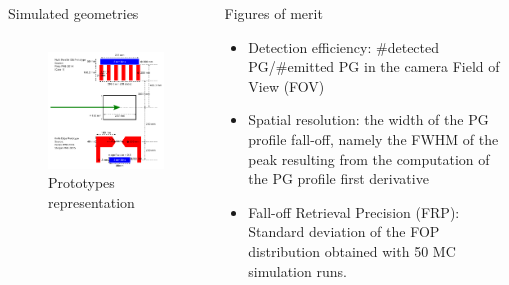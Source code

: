 \documentclass[final]{beamer} %
\begin{document}
\begin{frame}{}
\begin{columns}[t]
\begin{column}{0.49\textwidth}
\begin{block}{Simulated geometries}
\begin{columns}[t]
				\begin{column}{0.5\textwidth}
					\begin{figure}
						\includegraphics[width=\textwidth]{./figures/detectors_cyl}			
						\caption{Prototypes representation}
						\label{CamerasScheme}
					\end{figure}					
				\end{column}				

			\end{columns}

	  \end{block}		  
	\end{column} %
	
	\begin{column}{0.49\textwidth} %
	  \vspace{-2ex}
		
		
		
	  \begin{block}{Figures of merit}
			
			\begin{itemize}
				\item Detection efficiency: \#detected PG/\#emitted PG in the camera Field of View (FOV)
				\item Spatial resolution: the width of the PG profile fall-off, namely the FWHM of the peak resulting from the computation of the PG profile first derivative
				\item Fall-off Retrieval Precision (FRP): Standard deviation of the FOP distribution obtained with 50 MC simulation runs.
			\end{itemize}



\end{block}
\end{column}
\end{columns}
\end{frame}
\end{document}
